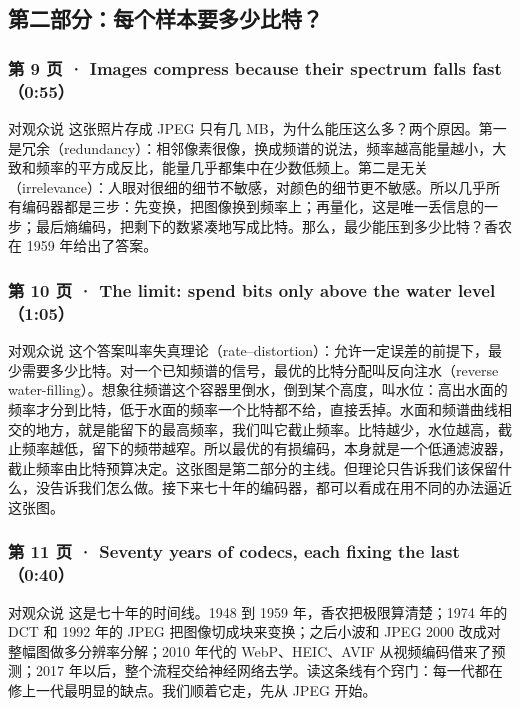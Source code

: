 \subsection*{第二部分：每个样本要多少比特？}

\subsubsection*{第 9 页 · Images compress because their spectrum falls fast（0:55）}
\begin{exampleblock}{对观众说}
这张照片存成 JPEG 只有几 MB，为什么能压这么多？两个原因。第一是冗余（redundancy）：相邻像素很像，换成频谱的说法，频率越高能量越小，大致和频率的平方成反比，能量几乎都集中在少数低频上。第二是无关（irrelevance）：人眼对很细的细节不敏感，对颜色的细节更不敏感。所以几乎所有编码器都是三步：先变换，把图像换到频率上；再量化，这是唯一丢信息的一步；最后熵编码，把剩下的数紧凑地写成比特。那么，最少能压到多少比特？香农在 1959 年给出了答案。
\end{exampleblock}

\subsubsection*{第 10 页 · The limit: spend bits only above the water level（1:05）}
\begin{exampleblock}{对观众说}
这个答案叫率失真理论（rate--distortion）：允许一定误差的前提下，最少需要多少比特。对一个已知频谱的信号，最优的比特分配叫反向注水（reverse water-filling）。想象往频谱这个容器里倒水，倒到某个高度，叫水位：高出水面的频率才分到比特，低于水面的频率一个比特都不给，直接丢掉。水面和频谱曲线相交的地方，就是能留下的最高频率，我们叫它截止频率。比特越少，水位越高，截止频率越低，留下的频带越窄。所以最优的有损编码，本身就是一个低通滤波器，截止频率由比特预算决定。这张图是第二部分的主线。但理论只告诉我们该保留什么，没告诉我们怎么做。接下来七十年的编码器，都可以看成在用不同的办法逼近这张图。
\end{exampleblock}

\subsubsection*{第 11 页 · Seventy years of codecs, each fixing the last（0:40）}
\begin{exampleblock}{对观众说}
这是七十年的时间线。1948 到 1959 年，香农把极限算清楚；1974 年的 DCT 和 1992 年的 JPEG 把图像切成块来变换；之后小波和 JPEG 2000 改成对整幅图做多分辨率分解；2010 年代的 WebP、HEIC、AVIF 从视频编码借来了预测；2017 年以后，整个流程交给神经网络去学。读这条线有个窍门：每一代都在修上一代最明显的缺点。我们顺着它走，先从 JPEG 开始。
\end{exampleblock}

